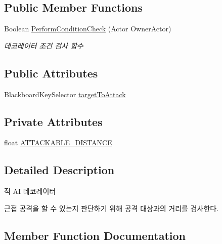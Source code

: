 \subsection*{Public Member Functions}
\begin{DoxyCompactItemize}
\item 
Boolean \hyperlink{class_close_enough_for_melee_attack___b_t_decorator_a86246ade4d7cacd71d6bac34ebf7ee6e}{Perform\+Condition\+Check} (Actor Owner\+Actor)
\begin{DoxyCompactList}\small\item\em 데코레이터 조건 검사 함수 \end{DoxyCompactList}\end{DoxyCompactItemize}
\subsection*{Public Attributes}
\begin{DoxyCompactItemize}
\item 
Blackboard\+Key\+Selector \hyperlink{class_close_enough_for_melee_attack___b_t_decorator_a282f26ed267baec9c049ccebc61f767e}{target\+To\+Attack}
\end{DoxyCompactItemize}
\subsection*{Private Attributes}
\begin{DoxyCompactItemize}
\item 
float \hyperlink{class_close_enough_for_melee_attack___b_t_decorator_ad97a0c9cac18c905a4ae4cfe59c07815}{A\+T\+T\+A\+C\+K\+A\+B\+L\+E\+\_\+\+D\+I\+S\+T\+A\+N\+CE}
\end{DoxyCompactItemize}


\subsection{Detailed Description}
적 AI 데코레이터 

근접 공격을 할 수 있는지 판단하기 위해 공격 대상과의 거리를 검사한다. 

\subsection{Member Function Documentation}
